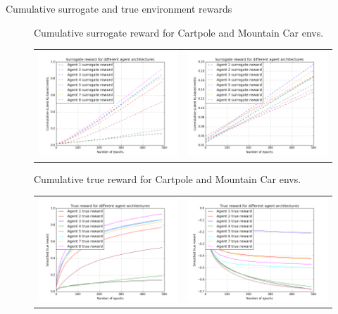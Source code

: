 \documentclass[final]{beamer}
\newlength{\onecolwid}
\begin{document}
\begin{frame}[t]
\begin{columns}[t]
\begin{column}{\onecolwid}
\begin{block}{Cumulative surrogate and true environment rewards}
\begin{figure}[h!]
Cumulative surrogate reward for Cartpole and Mountain Car envs.
{%
\begin{tabular}{ll}
    	 \includegraphics[width=0.45\columnwidth]{misc/cart_surrogate.png} &
		 \includegraphics[width=0.45\columnwidth]{misc/mc_surrogate.png} \\
	 \end{tabular}
}

Cumulative true reward for Cartpole and Mountain Car envs.
{%
\begin{tabular}{ll}
    	\includegraphics[width=0.45\columnwidth]{misc/cart_true.png} &
		 \includegraphics[width=0.45\columnwidth]{misc/mc_true.png} \\
	 \end{tabular}
}


\end{figure}
\end{block}
\end{column}
\end{columns}
\end{frame}
\end{document}
